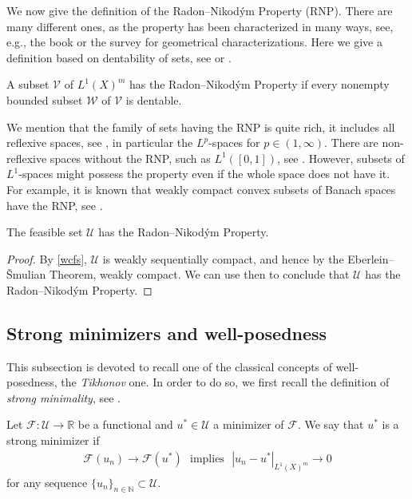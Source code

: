 \documentclass[hidelinks,onefignum,onetabnum]{siamart220329}
\begin{document}
We now give the definition of the Radon--Nikod\'ym Property (RNP). There are many different ones, as the property has been characterized in many ways, see, e.g., the book \cite{GeoRNP} or the survey \cite{HuffGeoRNP} for geometrical characterizations. Here we give a definition based on dentability of sets, see \cite[Definition 6.3.3]{VarTech} or \cite[Section 1.7.1]{Penot2013}.


\begin{definition}
	A subset $\mathcal V$ of ${L^1(X)^m}$ has the Radon--Nikod\'ym Property  if every nonempty bounded subset $\mathcal W$ of $\mathcal V$ is dentable.
\end{definition}


We mention that the family of sets having the RNP is quite rich, it includes all reflexive spaces, see \cite[Corollary 4.1.5]{GeoRNP}, in particular the $L^p$-spaces for $p\in(1,\infty)$. There are non-reflexive spaces without the RNP, such as $L^1([0,1])$, see  \cite[Example 2.1.2]{GeoRNP}. However, subsets of $L^1$-spaces might possess the property even if the whole space does not have it. For example, it is known that weakly compact convex subsets of Banach spaces have the RNP, see \cite[Theorem 3.6.1]{GeoRNP}.
\begin{proposition}\label{RNPconset}
	The feasible set $\mathcal U$ has the Radon--Nikod\'ym Property.
\end{proposition}
\begin{proof}
			By \cref{wcfs}, $\mathcal U$ is weakly sequentially compact, and hence by the Eberlein–\v Smulian Theorem, weakly compact. We can use then \cite[Theorem 3.6.1]{GeoRNP} to conclude that $\mathcal U$ has the Radon--Nikod\'ym Property.
\end{proof}




\subsection{Strong minimizers and well-posedness}
This subsection is devoted to recall one of the classical concepts of well-posedness, the \textit{Tikhonov} one. In order to do so,  we first recall the definition of \textit{strong minimality}, see \cite[Definition 6.3.4]{VarTech}.
\begin{definition}
	Let $\mathcal F:\mathcal U\to\mathbb R$ be a functional and  $u^*\in\mathcal U$ a minimizer of $\mathcal F$. We say that $u^*$ is a strong minimizer if 
	\begin{align*}
		\mathcal F(u_n)\to\mathcal F(u^*)\,\,\,\,\text{implies}\,\,\,\, |u_n-u^*|_{L^1(X)^m}\to 0
	\end{align*}
for any sequence $\{u_{n}\}_{n\in\mathbb N}\subset\mathcal U$.
\end{definition}
\end{document}
